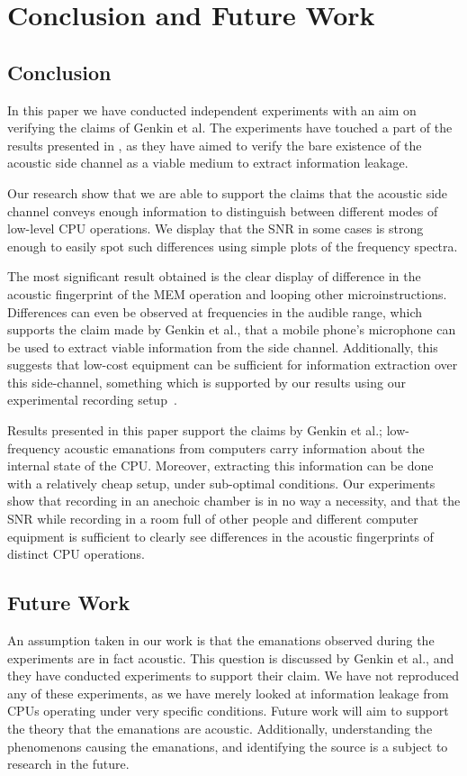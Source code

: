 \chapter{Conclusion and Future Work}\label{chp7:conclusion}

\section{Conclusion}
In this paper we have conducted independent experiments with an aim on verifying the claims of Genkin et al. 
The experiments have touched a part of the results presented in \cite{DBLP:conf/crypto/GenkinST14}, as they have aimed to verify the bare existence of the acoustic side channel as a viable medium to extract information leakage.

Our research show that we are able to support the claims that the acoustic side channel conveys enough information to distinguish between different modes of low-level CPU operations.
We display that the \gls{SNR} in some cases is strong enough to easily spot such differences using simple plots of the frequency spectra.

The most significant result obtained is the clear display of difference in the acoustic fingerprint of the MEM operation and looping other microinstructions.
Differences can even be observed at frequencies in the audible range, which supports the claim made by Genkin et al., that a mobile phone's microphone can be used to extract viable information from the side channel.
Additionally, this suggests that low-cost equipment can be sufficient for information extraction over this side-channel, something which is supported by our results using our experimental recording setup~\label{chp3:sec:knowles_configuration}.

Results presented in this paper support the claims by Genkin et al.; low-frequency acoustic emanations from computers carry information about the internal state of the \gls{CPU}.
Moreover, extracting this information can be done with a relatively cheap setup, under sub-optimal conditions.
Our experiments show that recording in an anechoic chamber is in no way a necessity, and that the \gls{SNR} while recording in a room full of other people and different computer equipment is sufficient to clearly see differences in the acoustic fingerprints of distinct \gls{CPU} operations.



\section{Future Work}\label{chp7:sec:future_work}
An assumption taken in our work is that the emanations observed during the experiments are in fact acoustic.
This question is discussed by Genkin et al., and they have conducted experiments to support their claim.
We have not reproduced any of these experiments, as we have merely looked at information leakage from CPUs operating under very specific conditions.
Future work will aim to support the theory that the emanations are acoustic.
Additionally, understanding the phenomenons causing the emanations, and identifying the source is a subject to research in the future.





